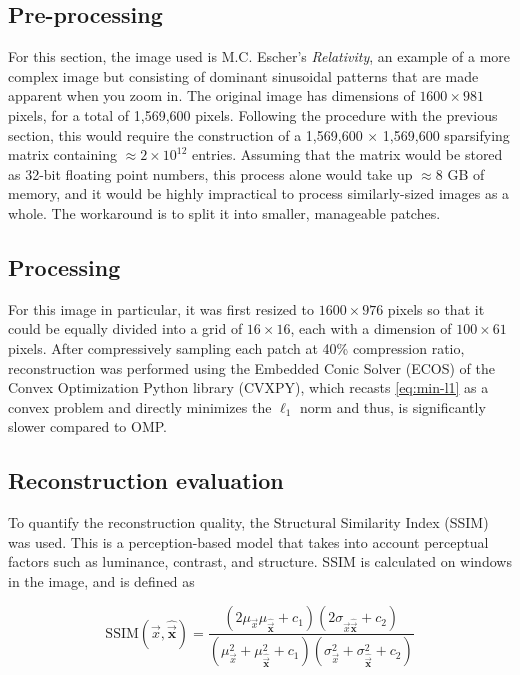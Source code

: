 \subsection{Pre-processing}
\label{ssec:image-multi-preprocess}
For this section, the image used is M.C. Escher's \textit{Relativity}, an example of a more complex image but consisting of dominant sinusoidal patterns that are made apparent when you zoom in. The original image has dimensions of $1600 \times 981$ pixels, for a total of 1,569,600 pixels. Following the procedure with the previous section, this would require the construction of a 1,569,600 $\times$ 1,569,600 sparsifying matrix containing $\approx 2 \times 10^{12}$ entries. Assuming that the matrix would be stored as 32-bit floating point numbers, this process alone would take up $\approx 8$ GB of memory, and it would be highly impractical to process similarly-sized images as a whole. The workaround is to split it into smaller, manageable patches. 

\subsection{Processing}
\label{ssec:image-multi-process}
For this image in particular, it was first resized to $1600 \times 976$ pixels so that it could be equally divided into a grid of $16 \times 16$, each with a dimension of $100 \times 61$ pixels. After compressively sampling each patch at 40\% compression ratio, reconstruction was performed using the Embedded Conic Solver (ECOS) of the Convex Optimization Python library (CVXPY), which recasts \eqref{eq:min-l1} as a convex problem and directly minimizes the $\ell_1$ norm \cite{ecos,cvxpy,cvxpy_rewriting} and thus, is significantly slower compared to OMP.

\subsection{Reconstruction evaluation}
\label{ssec:image-multi-error}
To quantify the reconstruction quality, the Structural Similarity Index (SSIM) \cite{Wang2004} was used. This is a perception-based model that takes into account perceptual factors such as luminance, contrast, and structure. SSIM is calculated on windows in the image, and is defined as

\begin{equation}
\label{eq:ssim}
\mathrm{SSIM}(\vec{x}, \bm\hat{\vec{x}}) = \frac{(2\mu_{\vec{x}}\mu_{\bm\hat{\vec{x}}} + c_1) (2\sigma_{\vec{x} \bm\hat{\vec{x}}} + c_2)}{(\mu_{\vec{x}}^2 + \mu_{\bm\hat{\vec{x}}}^2 + c_1) (\sigma_{\vec{x}}^2 + \sigma_{\bm\hat{\vec{x}}}^2 + c_2)}
\end{equation}

